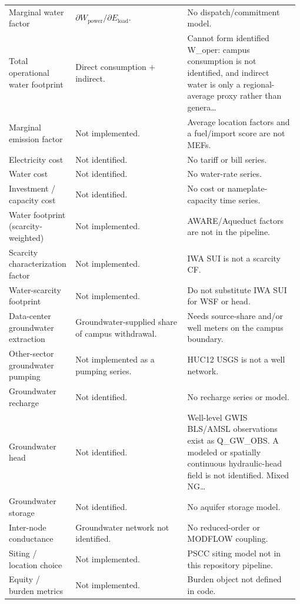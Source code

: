 \documentclass[11pt]{article}
\begin{document}
\begin{longtable}{@{}p{0.22\linewidth}p{0.38\linewidth}p{0.38\linewidth}@{}}
Marginal water factor & $\partial W_{\mathrm{power}} / \partial E_{\mathrm{load}}$. & No dispatch/commitment model.\\
Total operational water footprint & Direct consumption + indirect. & Cannot form identified W\_oper: campus consumption is not identified, and indirect water is only a regional-average proxy rather than genera\ldots\\
Marginal emission factor & Not implemented. & Average location factors and a fuel/import score are not MEFs.\\
Electricity cost & Not identified. & No tariff or bill series.\\
Water cost & Not identified. & No water-rate series.\\
Investment / capacity cost & Not identified. & No cost or nameplate-capacity time series.\\
Water footprint (scarcity-weighted) & Not implemented. & AWARE/Aqueduct factors are not in the pipeline.\\
Scarcity characterization factor & Not implemented. & IWA SUI is not a scarcity CF.\\
Water-scarcity footprint & Not implemented. & Do not substitute IWA SUI for WSF or head.\\
Data-center groundwater extraction & Groundwater-supplied share of campus withdrawal. & Needs source-share and/or well meters on the campus boundary.\\
Other-sector groundwater pumping & Not implemented as a pumping series. & HUC12 USGS is not a well network.\\
Groundwater recharge & Not identified. & No recharge series or model.\\
Groundwater head & Not identified. & Well-level GWIS BLS/AMSL observations exist as Q\_GW\_OBS. A modeled or spatially continuous hydraulic-head field is not identified. Mixed NG\ldots\\
Groundwater storage & Not identified. & No aquifer storage model.\\
Inter-node conductance & Groundwater network not identified. & No reduced-order or MODFLOW coupling.\\
Siting / location choice & Not implemented. & PSCC siting model not in this repository pipeline.\\
Equity / burden metrics & Not implemented. & Burden object not defined in code.\\
\end{longtable}
\endgroup
\end{document}
